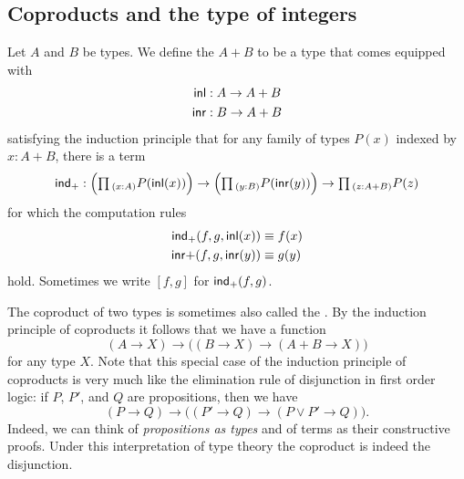 \subsection{Coproducts and the type of integers}
\begin{defn}
Let $A$ and $B$ be types. We define the  $A+B$ to be a type that comes equipped with
\begin{align*}
{\mathsf{inl}} & : A \to A+B \\
{\mathsf{inr}} & : B \to A+B
\end{align*}
satisfying the induction principle that for any family of types $P(x)$ indexed by $x:A+B$, there is a term
\begin{equation*}
\ind{+} : \Big(\prd{x:A}P(\inl(x))\Big)\to\Big(\prd{y:B}P(\inr(y))\Big)\to\prd{z:A+B}P(z)
\end{equation*}
for which the computation rules
\begin{align*}
\mathsf{ind}_{+}(f,g,{\mathsf{inl}}(x)) & \equiv f(x) \\
{\mathsf{inr}}{+}(f,g,{\mathsf{inr}}(y)) & \equiv g(y)
\end{align*}
hold. Sometimes we write $[f,g]$ for $\mathsf{ind}_{+}(f,g)$.
\end{defn}

The coproduct of two types is sometimes also called the . By the induction principle of coproducts it follows that we have a function
\begin{equation*}
  (A\to X) \to \big((B\to X) \to (A+B\to X)\big)
\end{equation*}
for any type $X$. Note that this special case of the induction principle of coproducts is very much like the elimination rule of disjunction in first order logic: if $P$, $P'$, and $Q$ are propositions, then we have
\begin{equation*}
  (P\to Q)\to \big((P'\to Q)\to (P\lor P'\to Q)\big).
\end{equation*}
Indeed, we can think of \emph{propositions as types} and of terms as their constructive proofs. Under this interpretation of type theory the coproduct is indeed the disjunction.

